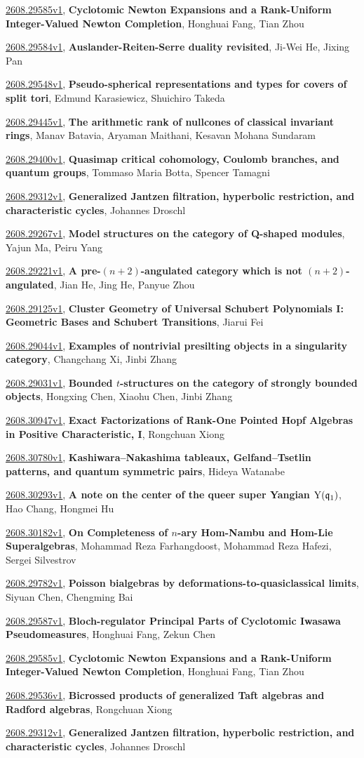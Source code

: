 \documentclass[9pt, a4paper]{article}
\theoremstyle{plain}
\theoremstyle{definition}
\theoremstyle{remark}
\newcommand{\arxiv}[3]{\href{https://arxiv.org/abs/#1}{#1}, \textbf{\textcolor{arxivblue}{#2}}, #3}
\begin{document}
\arxiv{2608.29585v1}{Cyclotomic Newton Expansions and a Rank-Uniform Integer-Valued Newton Completion}{Honghuai Fang, Tian Zhou}

\arxiv{2608.29584v1}{Auslander-Reiten-Serre duality revisited}{Ji-Wei He, Jixing Pan}

\arxiv{2608.29548v1}{Pseudo-spherical representations and types for covers of split tori}{Edmund Karasiewicz, Shuichiro Takeda}

\arxiv{2608.29445v1}{The arithmetic rank of nullcones of classical invariant rings}{Manav Batavia, Aryaman Maithani, Kesavan Mohana Sundaram}

\arxiv{2608.29400v1}{Quasimap critical cohomology, Coulomb branches, and quantum groups}{Tommaso Maria Botta, Spencer Tamagni}

\arxiv{2608.29312v1}{Generalized Jantzen filtration, hyperbolic restriction, and characteristic cycles}{Johannes Droschl}

\arxiv{2608.29267v1}{Model structures on the category of Q-shaped modules}{Yajun Ma, Peiru Yang}

\arxiv{2608.29221v1}{A pre-$(n+2)$-angulated category which is not $(n+2)$-angulated}{Jian He, Jing He, Panyue Zhou}

\arxiv{2608.29125v1}{Cluster Geometry of Universal Schubert Polynomials I: Geometric Bases and Schubert Transitions}{Jiarui Fei}

\arxiv{2608.29044v1}{Examples of nontrivial presilting objects in a singularity category}{Changchang Xi, Jinbi Zhang}

\arxiv{2608.29031v1}{Bounded $t$-structures on the category of strongly bounded objects}{Hongxing Chen, Xiaohu Chen, Jinbi Zhang}

\arxiv{2608.30947v1}{Exact Factorizations of Rank-One Pointed Hopf Algebras in Positive Characteristic, I}{Rongchuan Xiong}

\arxiv{2608.30780v1}{Kashiwara--Nakashima tableaux, Gelfand--Tsetlin patterns, and quantum symmetric pairs}{Hideya Watanabe}

\arxiv{2608.30293v1}{A note on the center of the queer super Yangian ${\rm Y}(\mathfrak{q}_1)$}{Hao Chang, Hongmei Hu}

\arxiv{2608.30182v1}{On Completeness of $n$-ary Hom-Nambu and Hom-Lie Superalgebras}{Mohammad Reza Farhangdoost, Mohammad Reza Hafezi, Sergei Silvestrov}

\arxiv{2608.29782v1}{Poisson bialgebras by deformations-to-quasiclassical limits}{Siyuan Chen, Chengming Bai}

\arxiv{2608.29587v1}{Bloch-regulator Principal Parts of Cyclotomic Iwasawa Pseudomeasures}{Honghuai Fang, Zekun Chen}

\arxiv{2608.29585v1}{Cyclotomic Newton Expansions and a Rank-Uniform Integer-Valued Newton Completion}{Honghuai Fang, Tian Zhou}

\arxiv{2608.29536v1}{Bicrossed products of generalized Taft algebras and Radford algebras}{Rongchuan Xiong}

\arxiv{2608.29312v1}{Generalized Jantzen filtration, hyperbolic restriction, and characteristic cycles}{Johannes Droschl}

\end{document}
